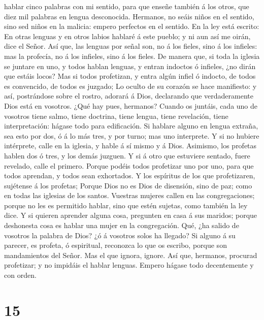 hablar cinco palabras con mi sentido, para que enseñe también á los
otros, que diez mil palabras en lengua desconocida. 
Hermanos, no seáis niños en el sentido, sino sed niños en la malicia:
empero perfectos en el sentido.  En la ley está escrito:
En otras lenguas y en otros labios hablaré á este pueblo; y ni aun así
me oirán, dice el Señor.  Así que, las lenguas por señal
son, no á los fieles, sino á los infieles: mas la profecía, no á los
infieles, sino á los fieles.  De manera que, si toda la
iglesia se juntare en uno, y todos hablan lenguas, y entran indoctos ó
infieles, ¿no dirán que estáis locos?  Mas si todos
profetizan, y entra algún infiel ó indocto, de todos es convencido, de
todos es juzgado;  Lo oculto de su corazón se hace
manifiesto: y así, postrándose sobre el rostro, adorará á Dios,
declarando que verdaderamente Dios está en vosotros. 
¿Qué hay pues, hermanos? Cuando os juntáis, cada uno de vosotros tiene
salmo, tiene doctrina, tiene lengua, tiene revelación, tiene
interpretación: hágase todo para edificación.  Si hablare
alguno en lengua extraña, sea esto por dos, ó á lo más tres, y por
turno; mas uno interprete.  Y si no hubiere intérprete,
calle en la iglesia, y hable á sí mismo y á Dios. 
Asimismo, los profetas hablen dos ó tres, y los demás juzguen.
 Y si á otro que estuviere sentado, fuere revelado, calle
el primero.  Porque podéis todos profetizar uno por uno,
para que todos aprendan, y todos sean exhortados.  Y los
espíritus de los que profetizaren, sujétense á los profetas;
 Porque Dios no es Dios de disensión, sino de paz; como
en todas las iglesias de los santos.  Vuestras mujeres
callen en las congregaciones; porque no les es permitido hablar, sino
que estén sujetas, como también la ley dice.  Y si
quieren aprender alguna cosa, pregunten en casa á sus maridos; porque
deshonesta cosa es hablar una mujer en la congregación. 
Qué, ¿ha salido de vosotros la palabra de Dios? ¿ó á vosotros solos ha
llegado?  Si alguno á su parecer, es profeta, ó
espiritual, reconozca lo que os escribo, porque son mandamientos del
Señor.  Mas el que ignora, ignore.  Así
que, hermanos, procurad profetizar; y no impidáis el hablar lenguas.
 Empero hágase todo decentemente y con orden.

\hypertarget{section-14}{%
\section{15}\label{section-14}}

